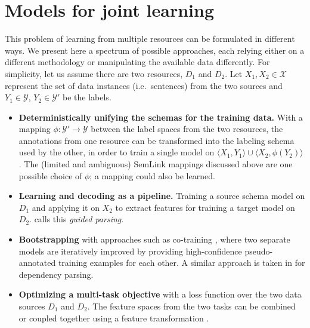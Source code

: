 \documentclass[11pt]{article}
\begin{document}
\section{Models for joint learning}\label{sec:modeling}
This problem of learning from multiple resources can be formulated in different ways. We present here a spectrum of possible approaches, each relying either on a different methodology or manipulating the available data differently. For simplicity, let us assume there are two resources, $D_1$ and $D_2$. Let $X_1, X_2 \in \mathcal{X}$ represent the set of data instances (i.e.~sentences) from the two sources and $Y_1 \in \mathcal{Y}$, $Y_2 \in \mathcal{Y}'$ be the labels.
\begin{itemize}
\item \textbf{Deterministically unifying the schemas for the training data.} With a mapping $\phi : \mathcal{Y}' \rightarrow \mathcal{Y}$ between the label spaces from the two resources, the annotations from one resource can be transformed into the labeling schema used by the other, in order to train a single model 
on $\langle X_1, Y_1\rangle \cup \langle X_2, \phi(Y_2)\rangle$. The (limited and ambiguous) SemLink mappings discussed above are one possible choice of $\phi$; a mapping could also be learned.
\item \textbf{Learning and decoding as a pipeline.} Training a source schema model on $D_1$ and applying it on $X_2$ to extract features for training a target model on $D_2$. 
 calls this \emph{guided parsing}. 
\item \textbf{Bootstrapping} with approaches such as co-training \citep{blum-98,clark03}, where two separate models are iteratively improved by 
providing high-confidence pseudo-annotated training examples for each other. A similar approach is taken in \citet{zhou:2013} for dependency parsing.
\item \textbf{Optimizing a multi-task objective} with a loss function over the two data sources $D_1$ and $D_2$. 
The feature spaces from the two tasks can be combined \citep{daume-07,johansson-13} or coupled together using a feature transformation \citep{mtfl,scl}.
\end{itemize}
\end{document}
